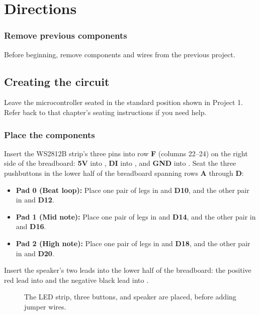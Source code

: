 \section{Directions}

\subsubsection{Remove previous components}
Before beginning, remove components and wires from the previous project.

\subsection{Creating the circuit}

Leave the microcontroller seated in the standard position shown in Project 1. Refer back to
that chapter's seating instructions if you need help.

\subsubsection{Place the components}
Insert the WS2812B strip's three pins into row \textbf{F} (columns 22--24) on the right side of the
breadboard: \textbf{5V} into , \textbf{DI} into
, and \textbf{GND} into .
Seat the three pushbuttons in the lower half of the breadboard spanning rows \textbf{A} through
\textbf{D}:
\begin{itemize}
    \item \textbf{Pad 0 (Beat loop):} Place one pair of legs in  and \textbf{D10}, and the other pair in  and \textbf{D12}.
    \item \textbf{Pad 1 (Mid note):} Place one pair of legs in  and \textbf{D14}, and the other pair in  and \textbf{D16}.
    \item \textbf{Pad 2 (High note):} Place one pair of legs in  and \textbf{D18}, and the other pair in  and \textbf{D20}.
\end{itemize}
Insert the speaker's two leads into the lower half of the breadboard: the positive red lead
into  and the negative black lead into
.

\begin{figure}[H]
    \centering
    \caption{The LED strip, three buttons, and speaker are placed, before adding jumper wires.}
\end{figure}

